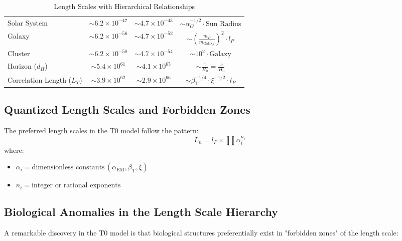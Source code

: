 \documentclass[12pt,a4paper]{article}
\newcommand{\alphaEM}{\alpha_{\text{EM}}}
\newcommand{\betaT}{\beta_{\text{T}}}
\begin{document}
\begin{table}[H]
\begin{adjustbox}{width=\textwidth}
\begin{tabular}{lccc}
				Solar System & \(\sim 6.2 \times 10^{-47}\) & \(\sim 4.7 \times 10^{-43}\) & \(\sim \alpha_G^{-1/2} \cdot \text{Sun Radius}\) \\
				Galaxy & \(\sim 6.2 \times 10^{-56}\) & \(\sim 4.7 \times 10^{-52}\) & \(\sim \left(\frac{m_P}{m_{\mathrm{Galaxy}}}\right)^2 \cdot l_P\) \\
				Cluster & \(\sim 6.2 \times 10^{-58}\) & \(\sim 4.7 \times 10^{-54}\) & \(\sim 10^2 \cdot \text{Galaxy}\) \\
				Horizon (\(d_H\)) & \(\sim 5.4 \times 10^{61}\) & \(\sim 4.1 \times 10^{65}\) & \(\sim \frac{1}{H_0} = \frac{c}{H_0}\) \\
				Correlation Length (\(L_T\)) & \(\sim 3.9 \times 10^{62}\) & \(\sim 2.9 \times 10^{66}\) & \(\sim \betaT^{-1/4} \cdot \xi^{-1/2} \cdot l_P\) \\
				\bottomrule
			\end{tabular}
		\end{adjustbox}
		\caption{Length Scales with Hierarchical Relationships}
		\label{tab:length_scales}
	\end{table}
	
	\subsection*{Quantized Length Scales and Forbidden Zones}
	
	The preferred length scales in the T0 model follow the pattern:
	\[
	L_n = l_P \times \prod \alpha_i^{n_i}
	\]
	where:
	\begin{itemize}
		\item \(\alpha_i = \text{dimensionless constants} \, (\alphaEM, \betaT, \xi)\)
		\item \(n_i = \text{integer or rational exponents}\)
	\end{itemize}
	
	\subsection*{Biological Anomalies in the Length Scale Hierarchy}
	
	A remarkable discovery in the T0 model is that biological structures preferentially exist in "forbidden zones" of the length scale:
	
\end{document}
